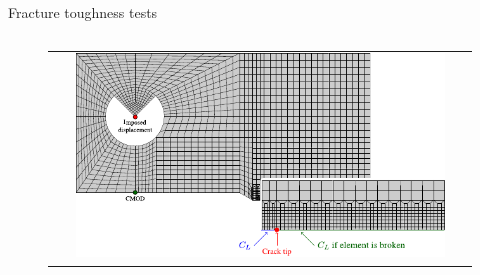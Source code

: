 \documentclass[9pt]{beamer}
\begin{document}
\begin{frame}{Fracture toughness tests}
\begin{columns}
        \begin{column}{0.6\textwidth}

        \begin{figure}
            \begin{tabular}{c}
                \includegraphics[width=0.9\textwidth]{Images/CT_BC.pdf}\\
            \end{tabular}
        \end{figure}

        \end{column}
    
    \end{columns}  

\end{frame}

\end{document}
